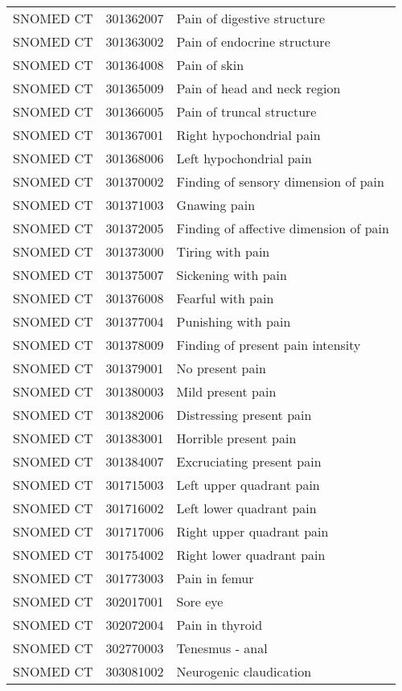\begin{longtable}{p{}p{}p{}}
  SNOMED CT & 301362007 & Pain of digestive structure \\ 
  SNOMED CT & 301363002 & Pain of endocrine structure \\ 
  SNOMED CT & 301364008 & Pain of skin \\ 
  SNOMED CT & 301365009 & Pain of head and neck region \\ 
  SNOMED CT & 301366005 & Pain of truncal structure \\ 
  SNOMED CT & 301367001 & Right hypochondrial pain \\ 
  SNOMED CT & 301368006 & Left hypochondrial pain \\ 
  SNOMED CT & 301370002 & Finding of sensory dimension of pain \\ 
  SNOMED CT & 301371003 & Gnawing pain \\ 
  SNOMED CT & 301372005 & Finding of affective dimension of pain \\ 
  SNOMED CT & 301373000 & Tiring with pain \\ 
  SNOMED CT & 301375007 & Sickening with pain \\ 
  SNOMED CT & 301376008 & Fearful with pain \\ 
  SNOMED CT & 301377004 & Punishing with pain \\ 
  SNOMED CT & 301378009 & Finding of present pain intensity \\ 
  SNOMED CT & 301379001 & No present pain \\ 
  SNOMED CT & 301380003 & Mild present pain \\ 
  SNOMED CT & 301382006 & Distressing present pain \\ 
  SNOMED CT & 301383001 & Horrible present pain \\ 
  SNOMED CT & 301384007 & Excruciating present pain \\ 
  SNOMED CT & 301715003 & Left upper quadrant pain \\ 
  SNOMED CT & 301716002 & Left lower quadrant pain \\ 
  SNOMED CT & 301717006 & Right upper quadrant pain \\ 
  SNOMED CT & 301754002 & Right lower quadrant pain \\ 
  SNOMED CT & 301773003 & Pain in femur \\ 
  SNOMED CT & 302017001 & Sore eye \\ 
  SNOMED CT & 302072004 & Pain in thyroid \\ 
  SNOMED CT & 302770003 & Tenesmus - anal \\ 
  SNOMED CT & 303081002 & Neurogenic claudication \\ 

\end{longtable}
